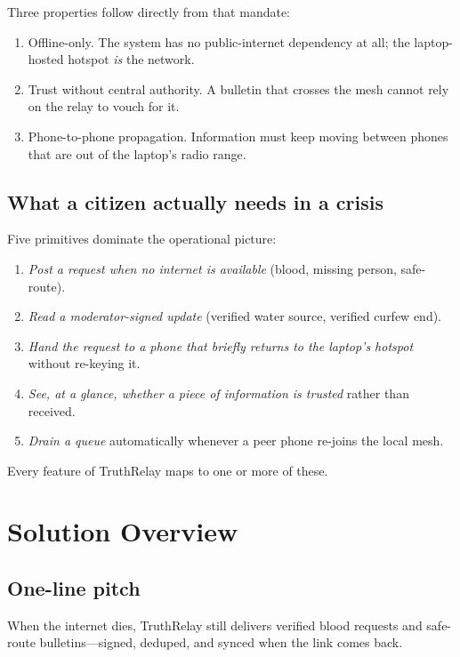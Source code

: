 \documentclass[11pt,a4paper]{article}
\newcommand{\projectname}{TruthRelay}
\begin{document}
Three properties follow directly from that mandate:
\begin{enumerate}[label=\textbf{\arabic*.}]
  \item Offline-only. The system has no public-internet dependency
        at all; the laptop-hosted hotspot \emph{is} the network.
  \item Trust without central authority. A bulletin that crosses the
        mesh cannot rely on the relay to vouch for it.
  \item Phone-to-phone propagation. Information must keep moving
        between phones that are out of the laptop's radio range.
\end{enumerate}

\subsection{What a citizen actually needs in a crisis}
\label{sec:needs}

Five primitives dominate the operational picture:
\begin{enumerate}[label=\textbf{\arabic*.}]
  \item \emph{Post a request when no internet is available} (blood,
        missing person, safe-route).
  \item \emph{Read a moderator-signed update} (verified water source,
        verified curfew end).
  \item \emph{Hand the request to a phone that briefly returns to
        the laptop's hotspot} without re-keying it.
  \item \emph{See, at a glance, whether a piece of information is
        trusted} rather than received.
  \item \emph{Drain a queue} automatically whenever a peer phone
        re-joins the local mesh.
\end{enumerate}

Every feature of \projectname{} maps to one or more of these.

\section{Solution Overview}
\label{sec:solution}

\subsection{One-line pitch}
When the internet dies, \projectname{} still delivers verified blood
requests and safe-route bulletins---signed, deduped, and synced when
the link comes back.
\end{document}
